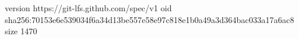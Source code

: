 version https://git-lfs.github.com/spec/v1
oid sha256:70153e6e539034f6a34d13be557e58e97c818e1b0a49a3d364bac033a17a6ac8
size 1470
